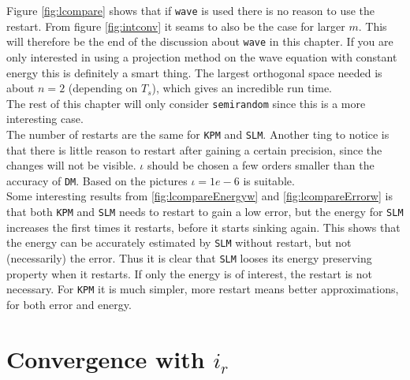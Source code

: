 Figure \ref{fig:lcompare} shows that if \texttt{wave} is used there is no reason to use the restart. From figure \ref{fig:intconv} it seams to also be the case for larger $m$. This will therefore be the end of the discussion about \texttt{wave} in this chapter. If you are only interested in using a projection method on the wave equation with constant energy this is definitely a smart thing. The largest orthogonal space needed is about $n=2$ (depending on $T_s$), which gives an incredible run time.\\
The rest of this chapter will only consider \texttt{semirandom} since this is a more interesting case. \\

\noindent The number of restarts are the same for \texttt{KPM} and \texttt{SLM}. Another ting to notice is that there is little reason to restart after gaining a certain precision, since the changes will not be visible. $\iota$ should be chosen a few orders smaller than the accuracy of \texttt{DM}. Based on the pictures $\iota = 1e-6$ is suitable. \\

\noindent Some interesting results from \ref{fig:lcompareEnergyw} and \ref{fig:lcompareErrorw} is that both \texttt{KPM} and \texttt{SLM} needs to restart to gain a low error, but the energy for \texttt{SLM} increases the first times it restarts, before it starts sinking again. This shows that the energy can be accurately estimated by \texttt{SLM} without restart, but not (necessarily) the error.  Thus it is clear that \texttt{SLM} looses its energy preserving property when it restarts. If only the energy is of interest, the restart is not necessary. For \texttt{KPM} it is much simpler, more restart means better approximations, for both error and energy.\\

\section{Convergence with $i_r$} %

